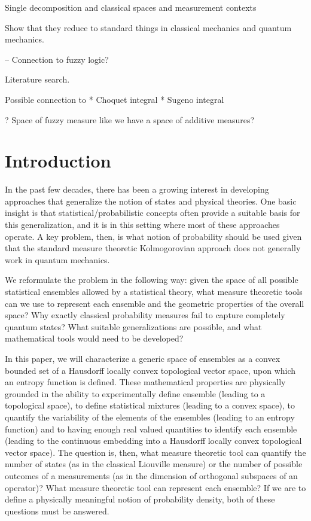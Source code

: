 \documentclass[10pt,twocolumn, nofootinbib]{revtex4-2}
\begin{document}
Single decomposition and classical spaces and measurement contexts

Show that they reduce to standard things in classical mechanics and quantum mechanics.

-- Connection to fuzzy logic?

Literature search.

Possible connection to
* Choquet integral
* Sugeno integral

? Space of fuzzy measure like we have a space of additive measures?


\section{Introduction}

In the past few decades, there has been a growing interest in developing approaches that generalize the notion of states and physical theories. One basic insight is that statistical/probabilistic concepts often provide a suitable basis for this generalization, and it is in this setting where most of these approaches operate. A key problem, then, is what notion of probability should be used given that the standard measure theoretic Kolmogorovian approach does not generally work in quantum mechanics.

We reformulate the problem in the following way: given the space of all possible statistical ensembles allowed by a statistical theory, what measure theoretic tools can we use to represent each ensemble and the geometric properties of the overall space? Why exactly classical probability measures fail to capture completely quantum states? What suitable generalizations are possible, and what mathematical tools would need to be developed?

In this paper, we will characterize a generic space of ensembles as a convex bounded set of a Hausdorff locally convex topological vector space, upon which an entropy function is defined. These mathematical properties are physically grounded in the ability to experimentally define ensemble (leading to a topological space), to define statistical mixtures (leading to a convex space), to quantify the variability of the elements of the ensembles (leading to an entropy function) and to having enough real valued quantities to identify each ensemble (leading to the continuous embedding into a Hausdorff locally convex topological vector space). The question is, then, what measure theoretic tool can quantify the number of states (as in the classical Liouville measure) or the number of possible outcomes of a measurements (as in the dimension of orthogonal subspaces of an operator)? What measure theoretic tool can represent each ensemble? If we are to define a physically meaningful notion of probability density, both of these questions must be answered.
\end{document}
